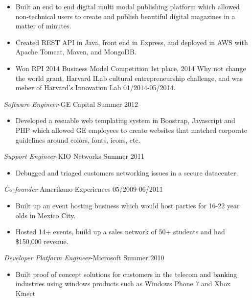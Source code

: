 \documentclass[line,margin]{res}
\begin{document}
\begin{resume}
\begin{itemize}  \itemsep -4pt
\item Built an end to end digital multi modal publishing platform which allowed non-technical users to create and publish beautiful digital magazines in a matter of minutes.
\item Created REST API in Java, front end in Express, and deployed in AWS with Apache Tomcat, Maven, and MongoDB.
\item Won RPI 2014 Business Model Competition 1st place, 2014 Why not change the world grant, Harvard ILab cultural entrepreneurship challenge, and was meber of Harvard's Innovation Lab 01/2014-05/2014.
\end{itemize}
{\sl Software Engineer}-GE Capital \hfill Summer 2012
\begin{itemize}  \itemsep -4pt
\item Developed a resuable web templating system in Boostrap, Javascript and PHP which allowed GE employees to create websites that matched corporate guidelines around colors, fonts, icons, etc.
\end{itemize}
{\sl Support Engineer}-KIO Networks \hfill Summer 2011
\begin{itemize}  \itemsep -4pt
\item Debugged and triaged customers networking issues in a secure datacenter.
\end{itemize}
{\sl Co-founder}-Amerikano Experiences \hfill 05/2009-06/2011
\begin{itemize}  \itemsep -4pt
\item Built up an event hosting business which would host parties for 16-22 year olds in Mexico City.
\item Hosted 14+ events, build up a sales network of 50+ students and had \$150,000 revenue.
\end{itemize}
{\sl Developer Platform Engineer}-Microsoft \hfill Summer 2010
\begin{itemize}  \itemsep -4pt
\item Built proof of concept solutions for customers in the telecom and banking industries using windows products such as Windows Phone 7 and Xbox Kinect
\end{itemize}
\end{resume}
\end{document}

